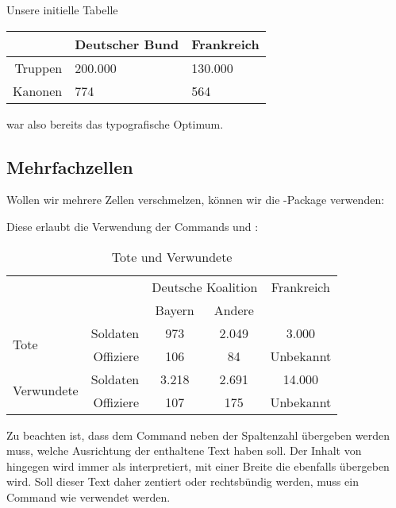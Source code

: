 Unsere initielle Tabelle
\begin{latexlisting}
	\begin{tabular}{r l l}
		\toprule
		& Deutscher Bund & Frankreich \\ \midrule
		Truppen & 200.000 & 130.000 \\ 
		Kanonen & 774 & 564 \\ \bottomrule
	\end{tabular}
\end{latexlisting}
war also bereits das typografische Optimum.

\subsection{Mehrfachzellen}
Wollen wir mehrere Zellen verschmelzen, können wir die -Package verwenden:
\begin{latexlisting}
	\usepackage{multirow}
\end{latexlisting}
Diese erlaubt die Verwendung der Commands  und :
\begin{latexlisting}
	\begin{table}
		\begin{tabular}{l r c c c}
			\toprule
			& & \multicolumn{2}{c}{Deutsche Koalition} & Frankreich \\  \cmidrule{3-4}
			& & Bayern & Andere & \\ \midrule
			\multirow{2}{2cm}{Tote} & Soldaten & 973 & 2.049 & 3.000 \\ 
			& Offiziere & 106 & 84 & Unbekannt \\ 
			\multirow{2}{2cm}{Verwundete} & Soldaten & 3.218 & 2.691 & 14.000 \\ 
			& Offiziere & 107 & 175 & Unbekannt \\ 
			\bottomrule
		\end{tabular}
		\caption{Tote und Verwundete}
		\label{tab:verlust-sedanschlacht}
	\end{table}
\end{latexlisting}
Zu beachten ist, dass dem Command  neben der Spaltenzahl übergeben werden muss, welche Ausrichtung der enthaltene Text haben soll.
Der Inhalt von  hingegen wird immer als  interpretiert, mit einer Breite die ebenfalls übergeben wird.
Soll dieser Text daher zentiert oder rechtsbündig werden, muss ein Command wie  verwendet werden.

